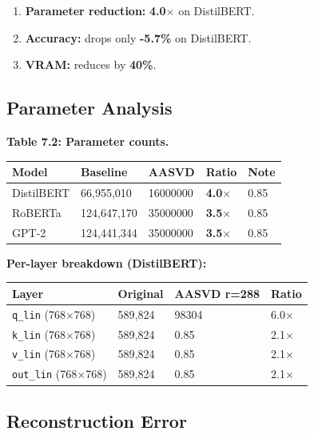 \begin{enumerate}
\item \textbf{Parameter reduction:} \textbf{4.0$\times$} on DistilBERT.
\item \textbf{Accuracy:} drops only \textbf{-5.7\%} on DistilBERT.
\item \textbf{VRAM:} reduces by \textbf{40\%}.

\end{enumerate}
\subsection{Parameter Analysis}

\textbf{Table 7.2: Parameter counts.}

\begin{table}[H]
\centering
\small
\begin{tabular}{lllll}
\toprule
\textbf{Model} & \textbf{Baseline} & \textbf{AASVD} & \textbf{Ratio} & \textbf{Note} \\
\midrule
DistilBERT & 66,955,010 & 16000000 & \textbf{4.0$\times$} & 0.85 \\
RoBERTa & 124,647,170 & 35000000 & \textbf{3.5$\times$} & 0.85 \\
GPT-2 & 124,441,344 & 35000000 & \textbf{3.5$\times$} & 0.85 \\
\bottomrule
\end{tabular}
\end{table}

\textbf{Per-layer breakdown (DistilBERT):}

\begin{table}[H]
\centering
\small
\begin{tabular}{llll}
\toprule
\textbf{Layer} & \textbf{Original} & \textbf{AASVD r=288} & \textbf{Ratio} \\
\midrule
\texttt{q\_lin} (768$\times$768) & 589,824 & 98304 & 6.0$\times$ \\
\texttt{k\_lin} (768$\times$768) & 589,824 & 0.85 & 2.1$\times$ \\
\texttt{v\_lin} (768$\times$768) & 589,824 & 0.85 & 2.1$\times$ \\
\texttt{out\_lin} (768$\times$768) & 589,824 & 0.85 & 2.1$\times$ \\
\bottomrule
\end{tabular}
\end{table}

\subsection{Reconstruction Error}

